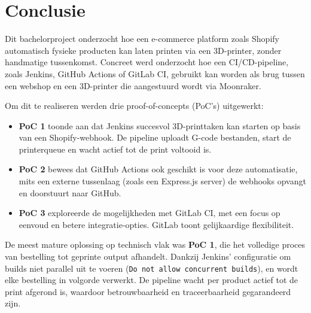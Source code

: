 
\chapter{Conclusie}%
\label{ch:conclusie}


Dit bachelorproject onderzocht hoe een e-commerce platform zoals Shopify automatisch fysieke producten kan laten printen via een 3D-printer, zonder handmatige tussenkomst. Concreet werd onderzocht hoe een CI/CD-pipeline, zoals Jenkins, GitHub Actions of GitLab CI, gebruikt kan worden als brug tussen een webshop en een 3D-printer die aangestuurd wordt via Moonraker.

Om dit te realiseren werden drie proof-of-concepts (PoC's) uitgewerkt:

\begin{itemize}
    \item \textbf{PoC 1} toonde aan dat Jenkins succesvol 3D-printtaken kan starten op basis van een Shopify-webhook. De pipeline uploadt G-code bestanden, start de printerqueue en wacht actief tot de print voltooid is.
    
    \item \textbf{PoC 2} bewees dat GitHub Actions ook geschikt is voor deze automatisatie, mits een externe tussenlaag (zoals een Express.js server) de webhooks opvangt en doorstuurt naar GitHub.
    
    \item \textbf{PoC 3} exploreerde de mogelijkheden met GitLab CI, met een focus op eenvoud en betere integratie-opties. GitLab toont gelijkaardige flexibiliteit.
\end{itemize}

De meest mature oplossing op technisch vlak was \textbf{PoC 1}, die het volledige proces van bestelling tot geprinte output afhandelt. Dankzij Jenkins' configuratie om builds niet parallel uit te voeren (\texttt{Do not allow concurrent builds}), en wordt elke bestelling in volgorde verwerkt. De pipeline wacht per product actief tot de print afgerond is, waardoor betrouwbaarheid en traceerbaarheid gegarandeerd zijn.

